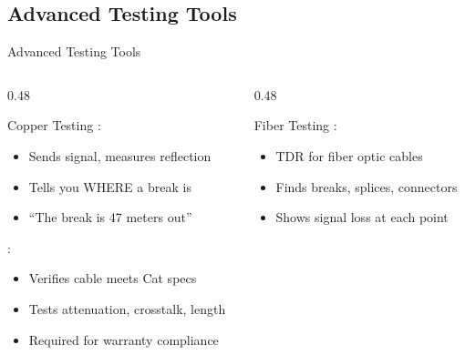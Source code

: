 \documentclass[aspectratio=169]{beamer}  %
\begin{document}
\subsection{Advanced Testing Tools}

\begin{frame}{Advanced Testing Tools}
    \begin{columns}[T]
        \begin{column}{0.48\textwidth}
            \begin{block}{Copper Testing}
                :
                \begin{itemize}
                    \item Sends signal, measures reflection
                    \item Tells you WHERE a break is
                    \item ``The break is 47 meters out''
                \end{itemize}
                
                \vspace{0.3em}
                :
                \begin{itemize}
                    \item Verifies cable meets Cat specs
                    \item Tests attenuation, crosstalk, length
                    \item Required for warranty compliance
                \end{itemize}
            \end{block}
        \end{column}
        \begin{column}{0.48\textwidth}
            \begin{block}{Fiber Testing}
                :
                \begin{itemize}
                    \item TDR for fiber optic cables
                    \item Finds breaks, splices, connectors
                    \item Shows signal loss at each point
                \end{itemize}
                

\end{block}
\end{column}
\end{columns}
\end{frame}
\end{document}

